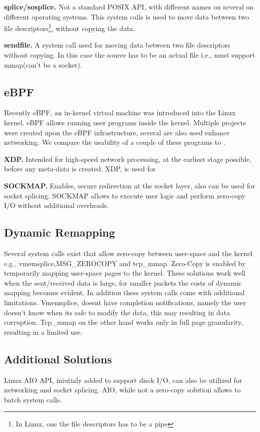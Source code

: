 \noindent\textbf{splice/sosplice\cite{splice,sosplice}.}
Not a standard POSIX API, with different names on several on different operating systems. This system calls is used to move data between two file descriptors\footnote{In Linux, one the file descriptors has to be a pipe}, without copying the data.

\noindent\textbf{sendfile\cite{sendfile}.}
A system call used for moving data between two file descriptors without copying. In this case the source has to be an actual file i.e., must support mmap(can't be a socket).

\subsection{eBPF}
Recently eBPF\cite{ebpf}, an in-kernel virtual machine was introduced into the Linux kernel. eBPF allows running user programs inside the kernel. Multiple projects\cite{ebpf_2} were created upon the eBPF infrastructure, several are also used enhance networking. We compare the usability of a couple of these programs to \oursys.

\noindent \textbf{XDP\cite{xdp}.} Intended for high-speed network processing, at the earliest stage possible, before any meta-data is created. XDP, is used for 


\noindent \textbf{SOCKMAP\cite{sockmap}.} Enables, secure redirection at the socket layer, also can be used for socket splicing\cite{cloudflare_sockmap}. SOCKMAP allows to execute user logic and perform zero-copy I/O without additional overheads.

\subsection{Dynamic Remapping}
Several system calls exist that allow zero-copy between user-space and the kernel e.g., vmemsplice\cite{vmsplice},MSG\_ZEROCOPY\cite{desendmsg} and tcp\_mmap\cite{tcp_mmap}.
Zero-Copy is enabled by temporarily mapping user-space pages to the kernel. These solutions work well when the sent/received data is large, for smaller packets the costs of dynamic mapping becomes evident. In addition these system calls come with additional limitations. Vmemsplice, doesnt have completion notifications, namely the user doesn't know when its safe to modify the data, this may resulting in data corruption. Tcp\_mmap on the other hand works only in full page granularity, resulting in a limited use. 

\subsection{Additional Solutions}
Linux AIO API\cite{aio}, iniutialy added to support disck I/O, can also be utilized for networking and socket splicing\cite{cloudflare_aio}. AIO, while not a zero-copy solution allows to batch system calls.

